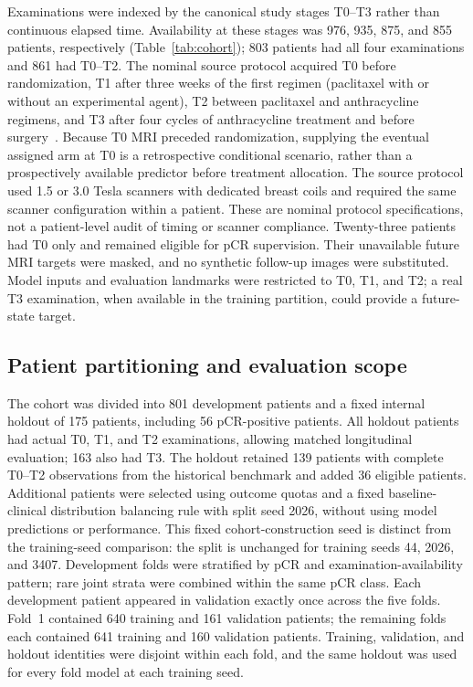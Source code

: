 Examinations were indexed by the canonical study stages T0--T3 rather than
continuous elapsed time. Availability at these stages was 976, 935, 875, and
855 patients, respectively (Table~\ref{tab:cohort}); 803 patients had all four
examinations and 861 had T0--T2. The nominal source protocol acquired T0 before
randomization, T1 after three weeks of the first regimen (paclitaxel with or
without an experimental agent), T2 between paclitaxel and anthracycline
regimens, and T3 after four cycles of anthracycline treatment and before
surgery~\citep{tciaispy2_2022}. Because T0 MRI preceded randomization, supplying
the eventual assigned arm at T0 is a retrospective conditional scenario,
rather than a prospectively available predictor before treatment allocation.
The source protocol used 1.5 or 3.0 Tesla scanners with dedicated breast coils
and required the same scanner configuration within a patient. These are
nominal protocol specifications, not a patient-level audit of timing or
scanner compliance. Twenty-three patients had T0 only and remained
eligible for pCR supervision. Their unavailable future MRI targets were
masked, and no synthetic follow-up images were substituted. Model inputs and
evaluation landmarks were restricted to T0, T1, and T2; a real T3 examination,
when available in the training partition, could provide a future-state target.

\subsection{Patient partitioning and evaluation scope}
The cohort was divided into 801 development patients and a fixed internal
holdout of 175 patients, including 56 pCR-positive patients. All holdout
patients had actual T0, T1, and T2 examinations, allowing matched longitudinal
evaluation; 163 also had T3. The holdout retained 139 patients with complete
T0--T2 observations from the historical benchmark and added 36 eligible
patients. Additional patients were selected using outcome quotas and a fixed
baseline-clinical distribution balancing rule with split seed 2026, without
using model predictions or performance. This fixed cohort-construction seed
is distinct from the training-seed comparison: the split is unchanged for
training seeds 44, 2026, and 3407. Development folds were stratified by
pCR and examination-availability pattern; rare joint strata were combined
within the same pCR class. Each development patient appeared in validation
exactly once across the five folds. Fold~1 contained 640 training and 161
validation patients; the remaining folds each contained 641 training and 160
validation patients. Training, validation, and holdout identities were
disjoint within each fold, and the same holdout was used for every fold
model at each training seed.

